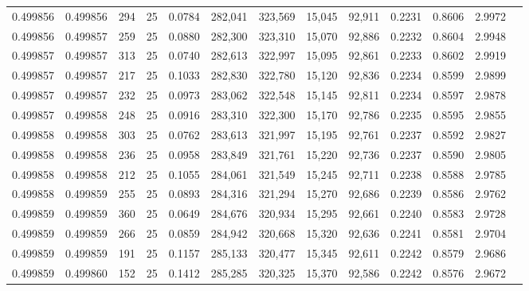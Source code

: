 \begin{tabular}{rrrrrrrrrrrrr}
0.499856 & 0.499856 &   294 &  25 &                                     0.0784 & 282,041 & 323,569 &  15,045 &  92,911 & 0.2231 & 0.8606 & 2.9972 \\
0.499856 & 0.499857 &   259 &  25 &                                     0.0880 & 282,300 & 323,310 &  15,070 &  92,886 & 0.2232 & 0.8604 & 2.9948 \\
0.499857 & 0.499857 &   313 &  25 &                                     0.0740 & 282,613 & 322,997 &  15,095 &  92,861 & 0.2233 & 0.8602 & 2.9919 \\
0.499857 & 0.499857 &   217 &  25 &                                     0.1033 & 282,830 & 322,780 &  15,120 &  92,836 & 0.2234 & 0.8599 & 2.9899 \\
0.499857 & 0.499857 &   232 &  25 &                                     0.0973 & 283,062 & 322,548 &  15,145 &  92,811 & 0.2234 & 0.8597 & 2.9878 \\
0.499857 & 0.499858 &   248 &  25 &                                     0.0916 & 283,310 & 322,300 &  15,170 &  92,786 & 0.2235 & 0.8595 & 2.9855 \\
0.499858 & 0.499858 &   303 &  25 &                                     0.0762 & 283,613 & 321,997 &  15,195 &  92,761 & 0.2237 & 0.8592 & 2.9827 \\
0.499858 & 0.499858 &   236 &  25 &                                     0.0958 & 283,849 & 321,761 &  15,220 &  92,736 & 0.2237 & 0.8590 & 2.9805 \\
0.499858 & 0.499858 &   212 &  25 &                                     0.1055 & 284,061 & 321,549 &  15,245 &  92,711 & 0.2238 & 0.8588 & 2.9785 \\
0.499858 & 0.499859 &   255 &  25 &                                     0.0893 & 284,316 & 321,294 &  15,270 &  92,686 & 0.2239 & 0.8586 & 2.9762 \\
0.499859 & 0.499859 &   360 &  25 &                                     0.0649 & 284,676 & 320,934 &  15,295 &  92,661 & 0.2240 & 0.8583 & 2.9728 \\
0.499859 & 0.499859 &   266 &  25 &                                     0.0859 & 284,942 & 320,668 &  15,320 &  92,636 & 0.2241 & 0.8581 & 2.9704 \\
0.499859 & 0.499859 &   191 &  25 &                                     0.1157 & 285,133 & 320,477 &  15,345 &  92,611 & 0.2242 & 0.8579 & 2.9686 \\
0.499859 & 0.499860 &   152 &  25 &                                     0.1412 & 285,285 & 320,325 &  15,370 &  92,586 & 0.2242 & 0.8576 & 2.9672 \\

\end{tabular}
